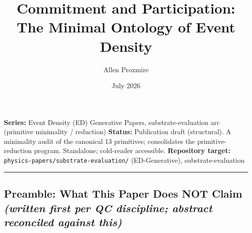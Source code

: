 \documentclass[
  11pt,
]{article}
\title{Commitment and Participation: The Minimal Ontology of Event
Density}
\author{Allen Proxmire}
\date{July 2026}
\begin{document}
\maketitle

\textbf{Series:} Event Density (ED) Generative Papers,
substrate-evaluation arc (primitive minimality / reduction)
\textbf{Status:} Publication draft (structural). A minimality audit of
the canonical 13 primitives; consolidates the primitive-reduction
program. Standalone; cold-reader accessible. \textbf{Repository target:}
\texttt{physics-papers/substrate-evaluation/} (ED-Generative),
substrate-evaluation

\begin{center}\rule{0.5\linewidth}{0.5pt}\end{center}

\subsection{\texorpdfstring{Preamble: What This Paper Does NOT Claim
\emph{(written first per QC discipline; abstract reconciled against
this)}}{Preamble: What This Paper Does NOT Claim (written first per QC discipline; abstract reconciled against this)}}\label{preamble-what-this-paper-does-not-claim-written-first-per-qc-discipline-abstract-reconciled-against-this}
\end{document}
